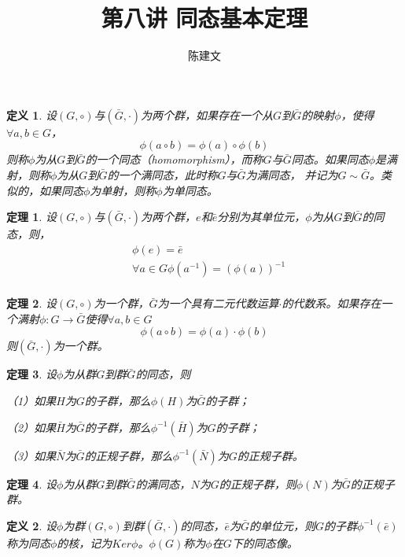 \documentclass{article}
\newtheorem{Def}{定义}
\newtheorem{Thm}{定理}
\begin{document}
\begin{CJK*}{UTF8}{gbsn}
  \title{第八讲 同态基本定理}
  \author{陈建文}
  \maketitle
  

\begin{Def}
  设$(G,\circ)$与$(\bar{G},\cdot)$为两个群，如果存在一个从$G$到$\bar{G}$的映射$\phi$，使得$\forall a,b\in G$，\[\phi(a\circ b)=\phi(a)\circ \phi(b)\]
  则称$\phi$为从$G$到$\bar{G}$的一个同态（homomorphism），而称$G$与$\bar{G}$同态。如果同态$\phi$是满射，则称$\phi$为从$G$到$\bar{G}$的一个满同态，此时称$G$与$\bar{G}$为满同态，
  并记为$G\sim \bar{G}$。类似的，如果同态$\phi$为单射，则称$\phi$为单同态。
\end{Def}

\begin{Thm}
  设$(G,\circ)$与$(\bar{G},\cdot)$为两个群，$e$和$\bar{e}$分别为其单位元，$\phi$为从$G$到$\bar{G}$的同态，则，
  \begin{align*}
    &\phi(e)=\bar{e}\\
    &\forall a\in G \phi(a^{-1})=(\phi(a))^{-1}\\
  \end{align*}
\end{Thm}

\begin{Thm}
  设$(G,\circ)$为一个群，$\bar{G}$为一个具有二元代数运算$\cdot$的代数系。如果存在一个满射$\phi:G\to \bar{G}$使得$\forall a,b\in G$
  \[\phi(a\circ b)=\phi(a) \cdot \phi(b)\]
  则$(\bar{G},\cdot)$为一个群。
\end{Thm}

\begin{Thm}
  设$\phi$为从群$G$到群$\bar{G}$的同态，则

  （1）如果$H$为$G$的子群，那么$\phi(H)$为$\bar{G}$的子群；

  （2）如果$\bar{H}$为$\bar{G}$的子群，那么$\phi^{-1}(\bar{H})$为$G$的子群；

  （3）如果$\bar{N}$为$\bar{G}$的正规子群，那么$\phi^{-1}(\bar{N})$为$G$的正规子群。
\end{Thm}

\begin{Thm}
设$\phi$为从群$G$到群$\bar{G}$的满同态，$N$为$G$的正规子群，则$\phi(N)$为$\bar{G}$的正规子群。
\end{Thm}

\begin{Def}
设$\phi$为群$(G,\circ)$到群$(\bar{G},\cdot)$的同态，$\bar{e}$为$\bar{G}$的单位元，则$G$的子群$\phi^{-1}(\bar{e})$称为同态$\phi$的核，记为$Ker \phi$。$\phi(G)$称为$\phi$在$G$下的同态像。
\end{Def}


\end{CJK*}
\end{document}
